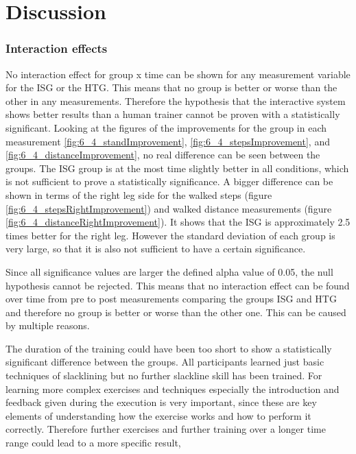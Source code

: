 \section{Discussion}\label{6_discussion}

\subsubsection{Interaction effects}
No interaction effect for group x time can be shown for any measurement variable for the ISG or the HTG.
This means that no group is better or worse than the other in any measurements.
Therefore the hypothesis that the interactive system shows better results than a human trainer cannot be proven with a statistically significant.
Looking at the figures of the improvements for the group in each measurement \ref{fig:6_4_standImprovement}, \ref{fig:6_4_stepsImprovement}, and \ref{fig:6_4_distanceImprovement}, no real difference can be seen between the groups.
The ISG group is at the most time slightly better in all conditions, which is not sufficient to prove a statistically significance.
A bigger difference can be shown in terms of the right leg side for the walked steps (figure \ref{fig:6_4_stepsRightImprovement}) and walked distance measurements (figure \ref{fig:6_4_distanceRightImprovement}).
It shows that the ISG is approximately 2.5 times better for the right leg.
However the standard deviation of each group is very large, so that it is also not sufficient to have a certain significance.

Since all significance values are larger the defined alpha value of 0.05, the null hypothesis cannot be rejected.
This means that no interaction effect can be found over time from pre to post measurements comparing the groups ISG and HTG and therefore no group is better or worse than the other one.
This can be caused by multiple reasons.

The duration of the training could have been too short to show a statistically significant difference between the groups.
All participants learned just basic techniques of slacklining but no further slackline skill has been trained.
For learning more complex exercises and techniques especially the introduction and feedback given during the execution is very important, since these are key elements of understanding how the exercise works and how to perform it correctly.
Therefore further exercises and further training over a longer time range  could lead to a more specific result, 

